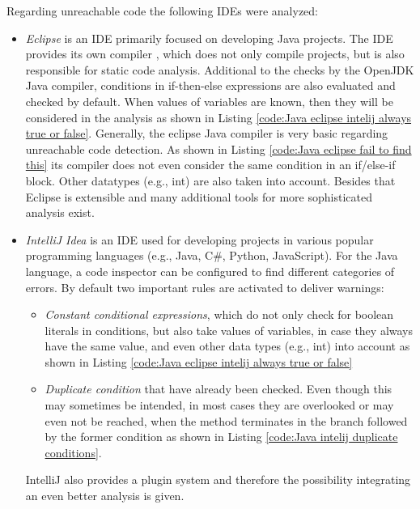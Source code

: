 Regarding unreachable code the following IDEs were analyzed:
\begin{itemize}
	\item \emph{Eclipse} \cite{incCommunityOpenInnovation} is an IDE primarily focused on developing Java projects. The IDE provides its own compiler \cite{teamJDTCoreComponent}, which does not only compile projects, but is also responsible for static code analysis. Additional to the checks by the OpenJDK \cite{OpenJDK} Java compiler, conditions in if-then-else expressions are also evaluated and checked by default. When values of variables are known, then they will be considered in the analysis as shown in Listing \ref{code:Java eclipse intelij always true or false}. Generally, the eclipse Java compiler is very basic regarding unreachable code detection. As shown in Listing \ref{code:Java eclipse fail to find this} its compiler does not even consider the same condition in an if/else-if block. Other datatypes (e.g., int) are also taken into account. Besides that Eclipse is extensible and many additional tools for more sophisticated analysis exist.
	
	\item \emph{IntelliJ Idea} \cite{IntelliJIDEACapable} is an IDE used for developing projects in various popular programming languages (e.g., Java, C\#, Python, JavaScript). For the Java language, a code inspector can be configured to find different categories of errors. By default two important rules are activated to deliver warnings: 
	\begin{itemize}
		\item \emph{Constant conditional expressions}, which do not only check for boolean literals in conditions, but also take values of variables, in case they always have the same value, and even other data types (e.g., int) into account as shown in Listing \ref{code:Java eclipse intelij always true or false}
		\item \emph{Duplicate condition} that have already been checked. Even though this may sometimes be intended, in most cases they are overlooked or may even not be reached, when the method terminates in the branch followed by the former condition as shown in Listing \ref{code:Java intelij duplicate conditions}. 
	\end{itemize}
	IntelliJ also provides a plugin system and therefore the possibility integrating an even better analysis is given.
\end{itemize}

